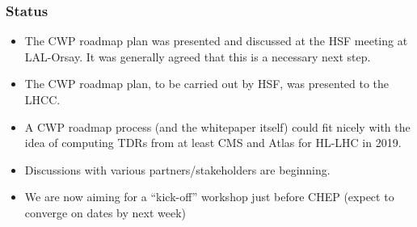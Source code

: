 \begin{frame}
\frametitle{Status}

\begin{itemize}
\item The CWP roadmap plan was presented and discussed at the HSF meeting at LAL-Orsay. It was generally agreed that this is a necessary next step.
\item The CWP roadmap plan, to be carried out by HSF, was presented to the LHCC.
\item A CWP roadmap process (and the whitepaper itself) could fit nicely with the idea of computing TDRs from at least CMS and Atlas for HL-LHC in 2019.
\item Discussions with various partners/stakeholders are beginning.
\item We are now aiming for a ``kick-off'' workshop just before CHEP (expect to converge on dates by next week)
\end{itemize}

\end{frame}


